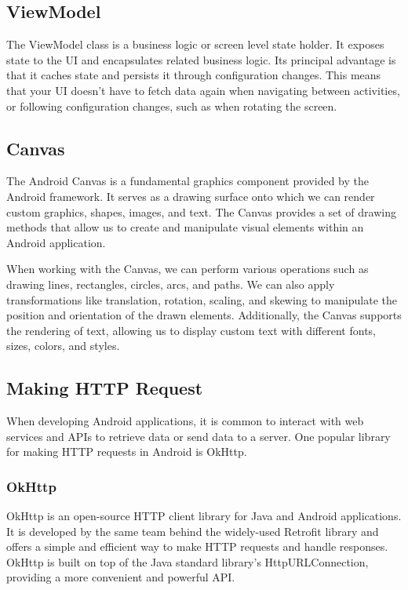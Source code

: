 \subsection{ViewModel}
The ViewModel class is a business logic or screen level state holder. It exposes state to the UI and encapsulates related business logic. Its principal advantage is that it caches state and persists it through configuration changes. This means that your UI doesn’t have to fetch data again when navigating between activities, or following configuration changes, such as when rotating the screen.

\subsection{Canvas}
The Android Canvas is a fundamental graphics component provided by the Android framework. It serves as a drawing surface onto which we can render custom graphics, shapes, images, and text. The Canvas provides a set of drawing methods that allow us to create and manipulate visual elements within an Android application.

When working with the Canvas, we can perform various operations such as drawing lines, rectangles, circles, arcs, and paths. We can also apply transformations like translation, rotation, scaling, and skewing to manipulate the position and orientation of the drawn elements. Additionally, the Canvas supports the rendering of text, allowing us to display custom text with different fonts, sizes, colors, and styles.

\subsection{Making HTTP Request}
When developing Android applications, it is common to interact with web services and APIs to retrieve data or send data to a server. One popular library for making HTTP requests in Android is OkHttp.

\subsubsection{OkHttp}
OkHttp is an open-source HTTP client library for Java and Android applications. It is developed by the same team behind the widely-used Retrofit library and offers a simple and efficient way to make HTTP requests and handle responses. OkHttp is built on top of the Java standard library's HttpURLConnection, providing a more convenient and powerful API.

